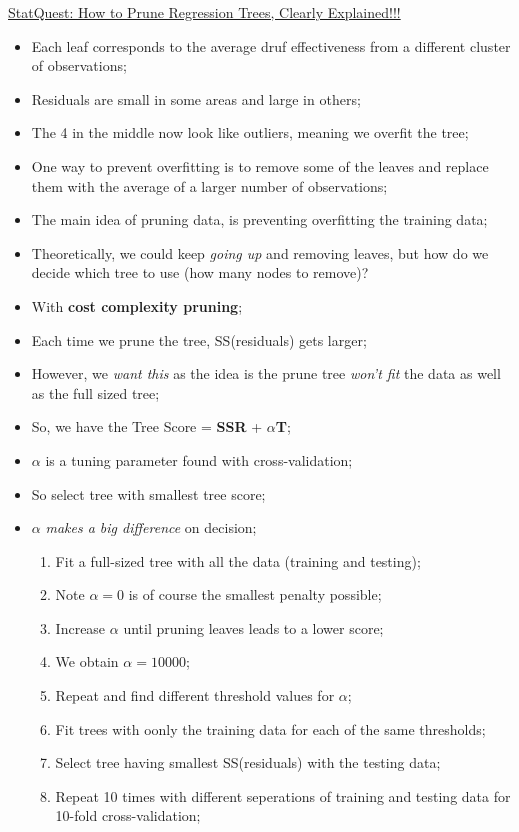 \documentclass[12pt, titlepage, french]{report}
\begin{document}
\begin{YTB_SUMM}[label = {TREES-PRUNING}]{\href{https://www.youtube.com/watch?v=D0efHEJsfHo&list=PLblh5JKOoLUICTaGLRoHQDuF_7q2GfuJF&index=37}{StatQuest: How to Prune Regression Trees, Clearly Explained!!!}}
\begin{itemize}
	\item	Each leaf corresponds to the average druf effectiveness from a different cluster of observations;
	\item	Residuals are small in some areas and large in others;
	\item[]	The 4 in the middle now look like outliers, meaning we overfit the tree;
	\item[]	One way to prevent overfitting is to remove some of the leaves and replace them with the average of a larger number of observations;
	\item	The main idea of pruning data, is preventing overfitting the training data;
	\item	Theoretically, we could keep \textit{going up} and removing leaves, but how do we decide which tree to use (how many nodes to remove)?
	\item[]	With \textbf{cost complexity pruning};
	\item	Each time we prune the tree, SS(residuals) gets larger;
	\item[]	However, we \textit{want this} as the idea is the prune tree \textit{won't fit} the data as well as the full sized tree;
	\item	So, we have the Tree Score = \textbf{SSR} + $\alpha$\textbf{T};
	\item	$\alpha$ is a tuning parameter found with cross-validation;
	\item	So select tree with smallest tree score;
	\item[]	$\alpha$ \textit{makes a big difference} on decision;
%	
		\begin{enumerate}
		\item	Fit a full-sized tree with all the data (training and testing);
		\item[]	Note $\alpha = 0$ is of course the smallest penalty possible;
		\item	Increase $\alpha$ until pruning leaves leads to a lower score;
		\item[]	We obtain $\alpha = 10 000$;
		\item	Repeat and find different threshold values for $\alpha$;
		\item	Fit trees with oonly the training data for each of the same thresholds;
		\item[]	Select tree having smallest SS(residuals) with the testing data;
		\item	Repeat 10 times with different seperations of training and testing data for 10-fold cross-validation;
		\end{enumerate}
\end{itemize}
\end{YTB_SUMM}
\end{document}
